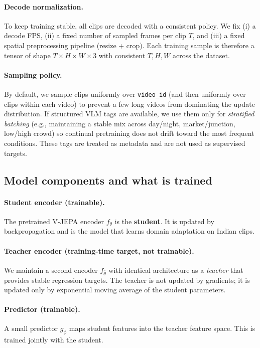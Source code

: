 \paragraph{Decode normalization.} To keep training stable, all clips are decoded with a consistent policy. We fix (i) a decode FPS, (ii) a fixed number of sampled frames per clip $T$, and (iii) a fixed spatial preprocessing pipeline (resize + crop). Each training sample is therefore a tensor of shape $T\times H\times W\times 3$ with consistent $T,H,W$ across the dataset.
\paragraph{Sampling policy.} By default, we sample clips uniformly over \texttt{video\_id} (and then uniformly over clips within each video) to prevent a few long videos from dominating the update distribution. If structured VLM tags are available, we use them only for \emph{stratified batching} (e.g., maintaining a stable mix across day/night, market/junction, low/high crowd) so continual pretraining does not drift toward the most frequent conditions. These tags are treated as metadata and are not used as supervised targets.

\subsection{Model components and what is trained}\label{sec:ctp_model}
\paragraph{Student encoder (trainable).} The pretrained V-JEPA encoder $f_\theta$ is the \textbf{student}. It is updated by backpropagation and is the model that learns domain adaptation on Indian clips.
\paragraph{Teacher encoder (training-time target, not trainable).} We maintain a second encoder $f_{\bar{\theta}}$ with identical architecture as a \emph{teacher} that provides stable regression targets. The teacher is not updated by gradients; it is updated only by exponential moving average of the student parameters.
\paragraph{Predictor (trainable).} A small predictor $g_\phi$ maps student features into the teacher feature space. This is trained jointly with the student.
